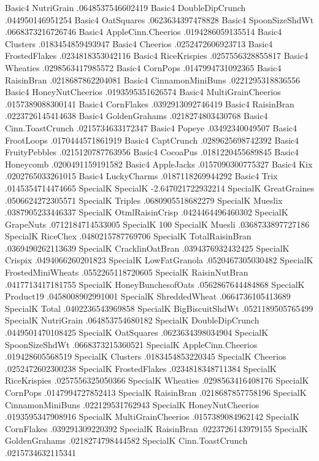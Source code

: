 Basic4	NutriGrain	.0648537546602419
Basic4	DoubleDipCrunch	.044950146951254
Basic4	OatSquares	.0623634397478828
Basic4	SpoonSizeShdWt	.0668373216726746
Basic4	AppleCinn.Cheerios	.0194286059135514
Basic4	Clusters	.0183454859493947
Basic4	Cheerios	.0252472606923713
Basic4	FrostedFlakes	.0234818353042116
Basic4	RiceKrispies	.0257556328855817
Basic4	Wheaties	.0298563417985572
Basic4	CornPops	.0147994731092365
Basic4	RaisinBran	.0218687862204081
Basic4	CinnamonMiniBuns	.0221295318836556
Basic4	HoneyNutCheerios	.0193595351626574
Basic4	MultiGrainCheerios	.0157389088300141
Basic4	CornFlakes	.0392913092746419
Basic4	RaisinBran	.0223726145414638
Basic4	GoldenGrahams	.0218274803430768
Basic4	Cinn.ToastCrunch	.0215734633172347
Basic4	Popeye	.03492340049507
Basic4	FrootLoops	.0170444571861919
Basic4	CaptCrunch	.0289625698742392
Basic4	FruityPebbles	.0215120787763956
Basic4	CocoaPus	.0181220455689845
Basic4	Honeycomb	.0200491159191582
Basic4	AppleJacks	.0157090300775327
Basic4	Kix	.0202765033261015
Basic4	LuckyCharms	.0187118269944292
Basic4	Trix	.0145354714474665
SpecialK	SpecialK	-2.647021722932214
SpecialK	GreatGraines	.0506624272305571
SpecialK	Triples	.0680905518682279
SpecialK	Mueslix	.0387905233446337
SpecialK	OtmlRaisinCrisp	.0424464496460302
SpecialK	GrapeNuts	.0712184714533005
SpecialK	100%
SpecialK	Muesli	.0368733897727186
SpecialK	RiceChex	.0480215787769706
SpecialK	TotalRaisinBran	.0369490262113639
SpecialK	CracklinOatBran	.0394376932432425
SpecialK	Crispix	.0494066260201823
SpecialK	LowFatGranola	.0520467305030482
SpecialK	FrostedMiniWheats	.0552265118720605
SpecialK	RaisinNutBran	.0417713417181755
SpecialK	HoneyBunchesofOats	.0562867644484868
SpecialK	Product19	.0458008902991001
SpecialK	ShreddedWheat	.0664736105413689
SpecialK	Total	.0402236543969858
SpecialK	BigBiscuitShdWt	.0521189505765499
SpecialK	NutriGrain	.064853754680182
SpecialK	DoubleDipCrunch	.0449501470108425
SpecialK	OatSquares	.0623634398034904
SpecialK	SpoonSizeShdWt	.0668373215360521
SpecialK	AppleCinn.Cheerios	.019428605568519
SpecialK	Clusters	.0183454853220345
SpecialK	Cheerios	.0252472602300238
SpecialK	FrostedFlakes	.0234818348711384
SpecialK	RiceKrispies	.0257556325050366
SpecialK	Wheaties	.0298563416408176
SpecialK	CornPops	.0147994727852413
SpecialK	RaisinBran	.0218687857758196
SpecialK	CinnamonMiniBuns	.022129531762943
SpecialK	HoneyNutCheerios	.0193595347908916
SpecialK	MultiGrainCheerios	.0157389084962142
SpecialK	CornFlakes	.039291309220392
SpecialK	RaisinBran	.0223726143979155
SpecialK	GoldenGrahams	.0218274798444582
SpecialK	Cinn.ToastCrunch	.0215734632115341
